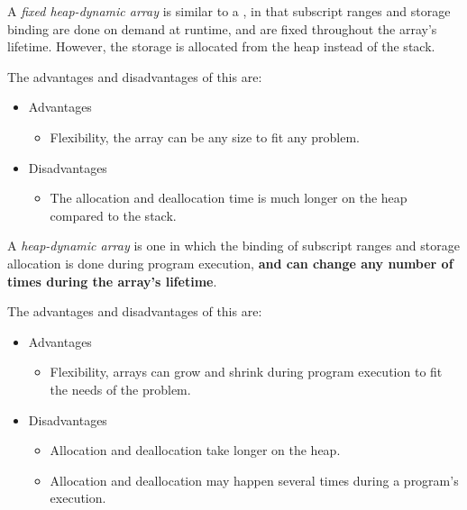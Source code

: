 \begin{definition}\label{def:Fixed_Heap_Dynamic_Array}
  A \emph{fixed heap-dynamic array} is similar to a , in that subscript ranges and storage binding are done on demand at runtime, and are fixed throughout the array's lifetime.
  However, the storage is allocated from the heap instead of the stack.

  The advantages and disadvantages of this are:
  \begin{itemize}[nosep,noitemsep]
  \item Advantages
    \begin{itemize}[nosep,noitemsep]
    \item Flexibility, the array can be any size to fit any problem.
    \end{itemize}
  \item Disadvantages
    \begin{itemize}[nosep,noitemsep]
    \item The allocation and deallocation time is much longer on the heap compared to the stack.
    \end{itemize}
  \end{itemize}
\end{definition}

\begin{definition}\label{def:Heap_Dynamic_Array}
  A \emph{heap-dynamic array} is one in which the binding of subscript ranges and storage allocation is done during program execution, \textbf{and can change any number of times during the array's lifetime}.

  The advantages and disadvantages of this are:
  \begin{itemize}[nosep,noitemsep]
  \item Advantages
    \begin{itemize}[nosep,noitemsep]
    \item Flexibility, arrays can grow and shrink during program execution to fit the needs of the problem.
    \end{itemize}
  \item Disadvantages
    \begin{itemize}[nosep,noitemsep]
    \item Allocation and deallocation take longer on the heap.
    \item Allocation and deallocation may happen several times during a program's execution.
    \end{itemize}
  \end{itemize}
\end{definition}

